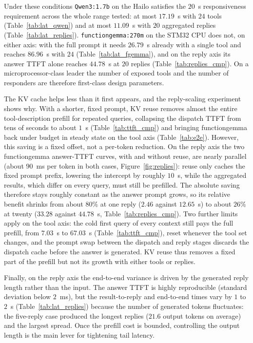Under these conditions \texttt{Qwen3:1.7b} on the Hailo satisfies the $20$~s
responsiveness requirement across the whole range tested: at most $17.19$~s with
$24$ tools (Table~\ref{tab:lat_qwen}) and at most $11.09$~s with $20$ aggregated
replies (Table~\ref{tab:lat_replies}). \texttt{functiongemma:270m} on the STM32 CPU
does not, on either axis: with the full prompt it needs $26.79$~s already with a
single tool and reaches $86.96$~s with $24$ (Table~\ref{tab:lat_fgemma}), and on the
reply axis its answer TTFT alone reaches $44.78$~s at $20$ replies
(Table~\ref{tab:replies_cmp}). On a microprocessor-class leader the number of
exposed tools and the number of responders are therefore first-class design
parameters.

The KV cache helps less than it first appears, and the reply-scaling experiment
shows why. With a shorter, fixed prompt, KV reuse removes almost the entire
tool-description prefill for repeated queries, collapsing the dispatch TTFT from tens
of seconds to about $1$~s (Table~\ref{tab:ttft_cmp}) and bringing functiongemma back under
budget in steady state on the tool axis (Table~\ref{tab:e2e}). However, this saving
is a fixed offset, not a per-token reduction. On the reply axis the two
functiongemma answer-TTFT curves, with and without reuse, are nearly parallel (about
$90$~ms per token in both cases, Figure~\ref{fig:replies}): reuse only caches the
fixed prompt prefix, lowering the intercept by roughly $10$~s, while the aggregated
results, which differ on every query, must still be prefilled. The absolute saving
therefore stays roughly constant as the answer prompt grows, so its relative benefit
shrinks from about $80\%$ at one reply ($2.46$ against $12.65$~s) to about $26\%$ at
twenty ($33.28$ against $44.78$~s, Table~\ref{tab:replies_cmp}). Two further limits
apply on the tool axis: the cold first query of every context still pays the full
prefill, from $7.03$~s to $67.03$~s (Table~\ref{tab:ttft_cmp}), reset whenever the tool set
changes, and the prompt swap between the dispatch and reply stages discards the
dispatch cache before the answer is generated. KV reuse thus removes a fixed part of
the prefill but not its growth with either tools or replies.

Finally, on the reply axis the end-to-end variance is driven by the generated reply
length rather than the input. The answer TTFT is highly reproducible (standard
deviation below $2$~ms), but the result-to-reply and end-to-end times vary by
$1$ to $2$~s (Table~\ref{tab:lat_replies}) because the number of generated tokens
fluctuates: the five-reply case produced the longest replies ($21.6$ output tokens
on average) and the largest spread. Once the prefill cost is bounded, controlling the
output length is the main lever for tightening tail latency.


